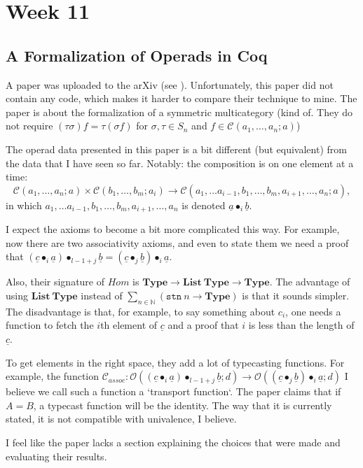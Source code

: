 \documentclass{amsbook}
\newcommand{\Catc}[1]{\mathcal{#1}}
\newcommand{\CC}{\Catc{C}}
\newcommand{\Catb}[1]{\mathbf{#1}}
\newcommand{\TYPE}{\Catb{Type}}
\newcommand{\Hom}[3]{{#1}(#2,#3)}
\begin{document}
  \chapter{Week 11}

  \section{A Formalization of Operads in Coq}
  A paper was uploaded to the arXiv (see \cite{arxiv-operads}). Unfortunately, this paper did not contain any code, which makes it harder to compare their technique to mine. The paper is about the formalization of a symmetric multicategory (kind of. They do not require $ (\tau \sigma) f = \tau (\sigma f) $ for $ \sigma, \tau \in S_n $ and $ f \in \Hom{\CC}{a_1}{\dots, a_n;a} $)
  
  The operad data presented in this paper is a bit different (but equivalent) from the data that I have seen so far. Notably: the composition is on one element at a time:
  \[ \Hom{\CC}{a_1}{\dots, a_n;a} \times \Hom{\CC}{b_1}{\dots, b_m; a_i} \to \Hom{\CC}{a_1}{\dots a_{i-1}, b_1, \dots, b_m, a_{i+1}, \dots, a_n; a}, \]
  in which $ a_1, \dots a_{i-1}, b_1, \dots, b_m, a_{i+1}, \dots, a_n $ is denoted $ \underline{a} \bullet_{i} \underline{b} $.

  I expect the axioms to become a bit more complicated this way. For example, now there are two associativity axioms, and even to state them we need a proof that $ (\underline c \bullet_i \underline a) \bullet_{l - 1 + j} \underline b = (\underline c \bullet_j \underline b) \bullet_i \underline a $.

  Also, their signature of $ \ensuremath{Hom} $ is $ \TYPE \to \mathbf{List}\ \TYPE \to \TYPE $. The advantage of using $ \mathbf{List}\ \TYPE $ instead of $ \sum_{n \in \mathbb N} (\mathtt{stn}\ n \to \TYPE) $ is that it sounds simpler. The disadvantage is that, for example, to say something about $ c_i $, one needs a function to fetch the $ i $th element of $ \underline c $ and a proof that $ i $ is less than the length of $ \underline{c} $.

  To get elements in the right space, they add a lot of typecasting functions. For example, the function $ \mathcal C_{assoc}: \mathcal O((\underline c \bullet_i \underline a) \bullet_{l - 1 + j} \underline b; d) \to \mathcal O((\underline c \bullet_j \underline b) \bullet_i \underline a; d) $ I believe we call such a function a `transport function`. The paper claims that if $ A = B $, a typecast function will be the identity. The way that it is currently stated, it is not compatible with univalence, I believe.

  I feel like the paper lacks a section explaining the choices that were made and evaluating their results.

  
  
\end{document}
